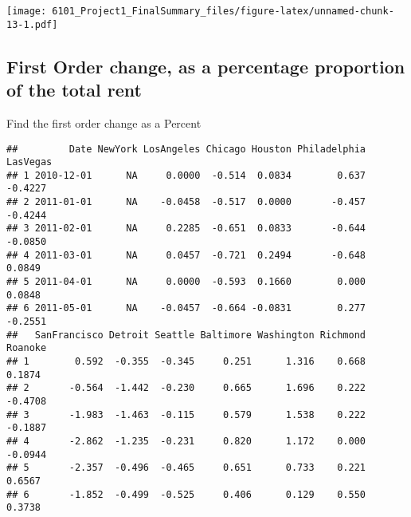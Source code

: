 \documentclass[
]{article}
\newenvironment{Shaded}{\begin{snugshade}}{\end{snugshade}}
\newcommand{\DecValTok}[1]{\textcolor[rgb]{0.00,0.00,0.81}{#1}}
\newcommand{\FunctionTok}[1]{\textcolor[rgb]{0.00,0.00,0.00}{#1}}
\newcommand{\NormalTok}[1]{#1}
\newcommand{\OtherTok}[1]{\textcolor[rgb]{0.56,0.35,0.01}{#1}}
\newcommand{\SpecialCharTok}[1]{\textcolor[rgb]{0.00,0.00,0.00}{#1}}
\begin{document}
\texttt{[image: 6101\_Project1\_FinalSummary\_files/figure-latex/unnamed-chunk-13-1.pdf]}

\hypertarget{first-order-change-as-a-percentage-proportion-of-the-total-rent}{%
\subsection{First Order change, as a percentage proportion of the total
rent}\label{first-order-change-as-a-percentage-proportion-of-the-total-rent}}

Find the first order change as a Percent

\begin{Shaded}
\end{Shaded}

\begin{verbatim}
##         Date NewYork LosAngeles Chicago Houston Philadelphia LasVegas
## 1 2010-12-01      NA     0.0000  -0.514  0.0834        0.637  -0.4227
## 2 2011-01-01      NA    -0.0458  -0.517  0.0000       -0.457  -0.4244
## 3 2011-02-01      NA     0.2285  -0.651  0.0833       -0.644  -0.0850
## 4 2011-03-01      NA     0.0457  -0.721  0.2494       -0.648   0.0849
## 5 2011-04-01      NA     0.0000  -0.593  0.1660        0.000   0.0848
## 6 2011-05-01      NA    -0.0457  -0.664 -0.0831        0.277  -0.2551
##   SanFrancisco Detroit Seattle Baltimore Washington Richmond Roanoke
## 1        0.592  -0.355  -0.345     0.251      1.316    0.668  0.1874
## 2       -0.564  -1.442  -0.230     0.665      1.696    0.222 -0.4708
## 3       -1.983  -1.463  -0.115     0.579      1.538    0.222 -0.1887
## 4       -2.862  -1.235  -0.231     0.820      1.172    0.000 -0.0944
## 5       -2.357  -0.496  -0.465     0.651      0.733    0.221  0.6567
## 6       -1.852  -0.499  -0.525     0.406      0.129    0.550  0.3738
\end{verbatim}
\end{document}
